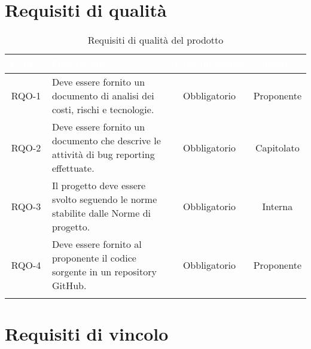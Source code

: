 \section{Requisiti di qualità}

\begingroup
\setlength{\tabcolsep}{10pt}
\renewcommand{\arraystretch}{1.5}
\begin{xltabular}{\textwidth}{| c | X | c | c |}
    \hline
     \textbf{\textcolor{white}{Codice}} & \textbf{\textcolor{white}{Descrizione}} & \textbf{\textcolor{white}{Classificazione}} & \textbf{\textcolor{white}{Fonte}}\\
    \hline
    \endhead
    RQO-1 & Deve essere fornito un documento di analisi dei costi, rischi e tecnologie. & Obbligatorio & Proponente \\
    \hline
    RQO-2 & Deve essere fornito un documento che descrive le attività di bug reporting effettuate. & Obbligatorio & Capitolato \\
    \hline
    RQO-3 & Il progetto deve essere svolto seguendo le norme stabilite dalle Norme di progetto. & Obbligatorio & Interna \\
    \hline
    RQO-4 & Deve essere fornito al proponente il codice sorgente in un repository GitHub. & Obbligatorio & Proponente \\
    \hline
     \caption{Requisiti di qualità del prodotto}
    \label{tab:reqqua}
\end{xltabular}
\endgroup

\section{Requisiti di vincolo}

